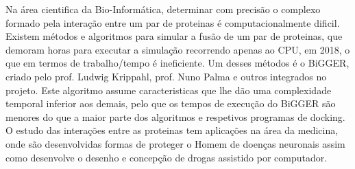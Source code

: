 


%
%
Na área cientifica da Bio-Informática, determinar com precisão o complexo formado pela interação entre um par de proteinas é computacionalmente dificil. 
Existem métodos e algoritmos para simular a fusão de um par de proteinas, que demoram horas para executar a simulação recorrendo apenas ao CPU, em 2018,  o que em termos de trabalho/tempo é ineficiente. 
Um desses métodos é o BiGGER, criado pelo prof. Ludwig Krippahl, prof. Nuno Palma e outros integrados no projeto. 
Este algoritmo assume caracteristicas que lhe dão uma complexidade temporal inferior aos demais, pelo que os tempos de execução do BiGGER são menores do que a maior parte dos algoritmos e respetivos programas de docking.
O estudo das interações entre as proteinas tem aplicações na área da medicina, onde são desenvolvidas formas de proteger o Homem de doenças neuronais assim como desenvolve o desenho e concepção de drogas assistido por computador. 

